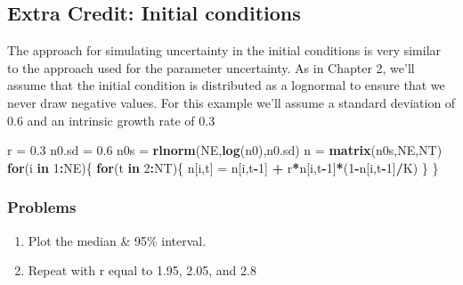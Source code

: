 \documentclass[]{article}
\newenvironment{Shaded}{\begin{snugshade}}{\end{snugshade}}
\newcommand{\KeywordTok}[1]{\textcolor[rgb]{0.13,0.29,0.53}{\textbf{#1}}}
\newcommand{\DecValTok}[1]{\textcolor[rgb]{0.00,0.00,0.81}{#1}}
\newcommand{\FloatTok}[1]{\textcolor[rgb]{0.00,0.00,0.81}{#1}}
\newcommand{\StringTok}[1]{\textcolor[rgb]{0.31,0.60,0.02}{#1}}
\newcommand{\ControlFlowTok}[1]{\textcolor[rgb]{0.13,0.29,0.53}{\textbf{#1}}}
\newcommand{\OperatorTok}[1]{\textcolor[rgb]{0.81,0.36,0.00}{\textbf{#1}}}
\newcommand{\NormalTok}[1]{#1}
\begin{document}
\subsection{Extra Credit: Initial
conditions}\label{extra-credit-initial-conditions}

The approach for simulating uncertainty in the initial conditions is
very similar to the approach used for the parameter uncertainty. As in
Chapter 2, we'll assume that the initial condition is distributed as a
lognormal to ensure that we never draw negative values. For this example
we'll assume a standard deviation of 0.6 and an intrinsic growth rate of
0.3

\begin{Shaded}
\begin{Highlighting}[]
\NormalTok{r =}\StringTok{ }\FloatTok{0.3}
\NormalTok{n0.sd =}\StringTok{ }\FloatTok{0.6}
\NormalTok{n0s =}\StringTok{ }\KeywordTok{rlnorm}\NormalTok{(NE,}\KeywordTok{log}\NormalTok{(n0),n0.sd)}
\NormalTok{n =}\StringTok{ }\KeywordTok{matrix}\NormalTok{(n0s,NE,NT)}
\ControlFlowTok{for}\NormalTok{(i }\ControlFlowTok{in} \DecValTok{1}\OperatorTok{:}\NormalTok{NE)\{}
  \ControlFlowTok{for}\NormalTok{(t }\ControlFlowTok{in} \DecValTok{2}\OperatorTok{:}\NormalTok{NT)\{}
\NormalTok{    n[i,t] =}\StringTok{ }\NormalTok{n[i,t}\OperatorTok{-}\DecValTok{1}\NormalTok{] }\OperatorTok{+}\StringTok{ }\NormalTok{r}\OperatorTok{*}\NormalTok{n[i,t}\OperatorTok{-}\DecValTok{1}\NormalTok{]}\OperatorTok{*}\NormalTok{(}\DecValTok{1}\OperatorTok{-}\NormalTok{n[i,t}\OperatorTok{-}\DecValTok{1}\NormalTok{]}\OperatorTok{/}\NormalTok{K)}
\NormalTok{  \}}
\NormalTok{\}}
\end{Highlighting}
\end{Shaded}

\subsubsection{Problems}\label{problems-4}

\begin{enumerate}
\def\labelenumi{\arabic{enumi}.}
\setcounter{enumi}{7}
\item
  Plot the median \& 95\% interval.
\item
  Repeat with r equal to 1.95, 2.05, and 2.8
\end{enumerate}
\end{document}
